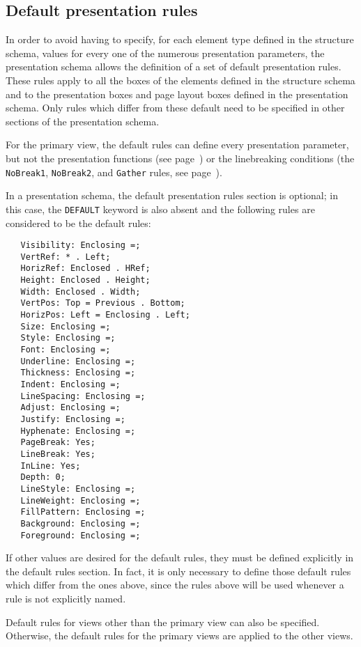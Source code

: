 \subsection{Default presentation rules}
\label{reglesdefaut}

In order to avoid having to specify, for each element type defined in
the structure schema, values for every one of the numerous
presentation parameters, the presentation schema allows the definition
of a set of default presentation rules.  These rules apply to all the
boxes of the elements defined in the structure schema and to the
presentation boxes and page layout boxes defined in the presentation
schema.  Only rules which differ from these default need to be
specified in other sections of the presentation schema.

For the primary view, the default rules can define every presentation
parameter, but not the presentation functions (see
page~\pageref{fonctpres}) or the linebreaking conditions (the {\tt
NoBreak1}, {\tt NoBreak2}, and {\tt Gather} rules, see
page~\pageref{condcoupure}).

In a presentation schema, the default presentation rules section is
optional; in this case, the {\tt DEFAULT} keyword is also absent and
the following rules are considered to be the default rules:

\begin{verbatim}
   Visibility: Enclosing =;
   VertRef: * . Left;
   HorizRef: Enclosed . HRef;
   Height: Enclosed . Height;
   Width: Enclosed . Width;
   VertPos: Top = Previous . Bottom;
   HorizPos: Left = Enclosing . Left;
   Size: Enclosing =;
   Style: Enclosing =;
   Font: Enclosing =;
   Underline: Enclosing =;
   Thickness: Enclosing =;
   Indent: Enclosing =;
   LineSpacing: Enclosing =;
   Adjust: Enclosing =;
   Justify: Enclosing =;
   Hyphenate: Enclosing =;
   PageBreak: Yes;
   LineBreak: Yes;
   InLine: Yes;
   Depth: 0;
   LineStyle: Enclosing =;
   LineWeight: Enclosing =;
   FillPattern: Enclosing =;
   Background: Enclosing =;
   Foreground: Enclosing =;
\end{verbatim}

If other values are desired for the default rules, they must be
defined explicitly in the default rules section.  In fact, it is only
necessary to define those default rules which differ from the ones
above, since the rules above will be used whenever a rule is not
explicitly named.

Default rules for views other than the primary  view can also be
specified.  Otherwise, the default rules for the primary views are
applied to the other views.

